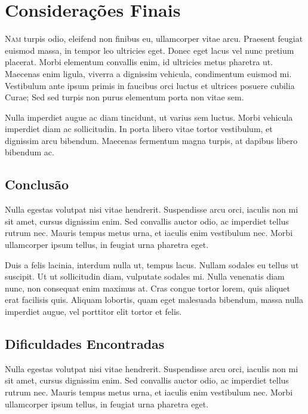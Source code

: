 \chapter{Considerações Finais}
\label{cap:conclusoes}

{\lettrine[loversize=0.25,findent=0.2em,nindent=0em]{N}{am} turpis odio, eleifend non finibus eu, ullamcorper vitae arcu. Praesent feugiat euismod massa, in tempor leo ultricies eget. Donec eget lacus vel nunc pretium placerat. Morbi elementum convallis enim, id ultricies metus pharetra ut. Maecenas enim ligula, viverra a dignissim vehicula, condimentum euismod mi. Vestibulum ante ipsum primis in faucibus orci luctus et ultrices posuere cubilia Curae; Sed sed turpis non purus elementum porta non vitae sem.

Nulla imperdiet augue ac diam tincidunt, ut varius sem luctus. Morbi vehicula imperdiet diam ac sollicitudin. In porta libero vitae tortor vestibulum, et dignissim arcu bibendum. Maecenas fermentum magna turpis, at dapibus libero bibendum ac.

\section{Conclusão}

Nulla egestas volutpat nisi vitae hendrerit. Suspendisse arcu orci, iaculis non mi sit amet, cursus dignissim enim. Sed convallis auctor odio, ac imperdiet tellus rutrum nec. Mauris tempus metus urna, et iaculis enim vestibulum nec. Morbi ullamcorper ipsum tellus, in feugiat urna pharetra eget.

Duis a felis lacinia, interdum nulla ut, tempus lacus. Nullam sodales eu tellus ut suscipit. Ut ut sollicitudin diam, vulputate sodales mi. Nulla venenatis diam nunc, non consequat enim maximus at. Cras congue tortor lorem, quis aliquet erat facilisis quis. Aliquam lobortis, quam eget malesuada bibendum, massa nulla imperdiet augue, vel porttitor elit tortor et felis.

\section{Dificuldades Encontradas}

Nulla egestas volutpat nisi vitae hendrerit. Suspendisse arcu orci, iaculis non mi sit amet, cursus dignissim enim. Sed convallis auctor odio, ac imperdiet tellus rutrum nec. Mauris tempus metus urna, et iaculis enim vestibulum nec. Morbi ullamcorper ipsum tellus, in feugiat urna pharetra eget.

}
